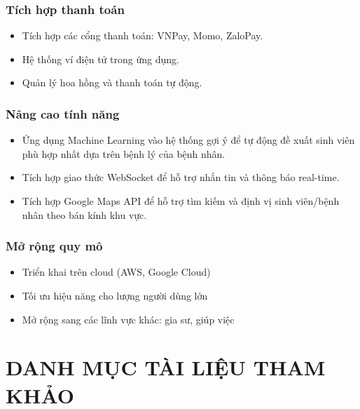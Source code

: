 \documentclass[13pt,a4paper]{extreport}
\begin{document}
\subsection{Tích hợp thanh toán}
\begin{itemize}
    \item Tích hợp các cổng thanh toán: VNPay, Momo, ZaloPay.
    \item Hệ thống ví điện tử trong ứng dụng.
    \item Quản lý hoa hồng và thanh toán tự động.
\end{itemize}

\subsection{Nâng cao tính năng}
\begin{itemize}
    \item Ứng dụng Machine Learning vào hệ thống gợi ý để tự động đề xuất sinh viên phù hợp nhất dựa trên bệnh lý của bệnh nhân.
    \item Tích hợp giao thức WebSocket để hỗ trợ nhắn tin và thông báo real-time.
    \item Tích hợp Google Maps API để hỗ trợ tìm kiếm và định vị sinh viên/bệnh nhân theo bán kính khu vực.
\end{itemize}

\subsection{Mở rộng quy mô}
\begin{itemize}
    \item Triển khai trên cloud (AWS, Google Cloud)
    \item Tối ưu hiệu năng cho lượng người dùng lớn
    \item Mở rộng sang các lĩnh vực khác: gia sư, giúp việc
\end{itemize}

\newpage

\chapter*{DANH MỤC TÀI LIỆU THAM KHẢO}
\end{document}
